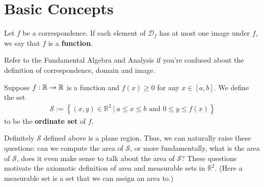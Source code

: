 	\section{Basic Concepts}
	\begin{definitionenv}
		Let $f$ be a correspondence. If each element of $\mathscr{D}_f$ has at most one image under $f$, we say that $f$ is a \textbf{function}.
	\end{definitionenv}
	\begin{remarkenv}
		Refer to the Fundamental Algebra and Analysis if you're confused about the definition of correspondence, domain and image.
	\end{remarkenv}
	\begin{definitionenv}
		Suppose $f:\mathbb{R} \to \mathbb{R}$ is a function and $f(x)\ge 0$ for any $x\in \left[ a,b\right] $. We define the set
		\begin{align*}
			\mathcal S:=\left\{ (x,y)\in \mathbb{R}^2\ |\ a\le x \le b\text{ and } 0\le y\le f(x)\right\}
		\end{align*}
		to be the \textbf{ordinate set} of $f$.
	\end{definitionenv}
	\begin{remarkenv}
		Definitely $\mathcal{S}$ defined above is a plane region. Thus, we can naturally raise these questions: can we compute the area of $\mathcal{S}$, or more fundamentally, what is the area of $\mathcal{S}$, does it even make sense to talk about the area of $\mathcal{S}$? These questions motivate the axiomatic definition of area and measurable sets in $\mathbb{R}^2$. (Here a measurable set is a set that we can assign an area to.)
	\end{remarkenv}
